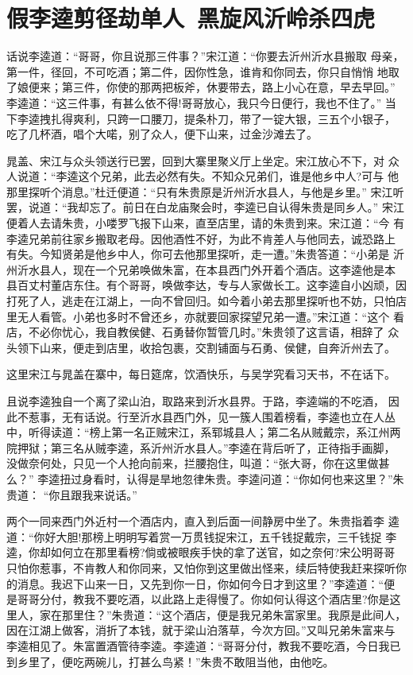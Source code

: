 \chapter{假李逵剪径劫单人~黑旋风沂岭杀四虎}

话说李逵道：“哥哥，你且说那三件事？”宋江道：“你要去沂州沂水县搬取
母亲，第一件，径回，不可吃酒；第二件，因你性急，谁肯和你同去，你只自悄悄
地取了娘便来；第三件，你使的那两把板斧，休要带去，路上小心在意，早去早回。”
李逵道：“这三件事，有甚么依不得!哥哥放心，我只今日便行，我也不住了。”
当下李逵拽扎得爽利，只跨一口腰刀，提条朴刀，带了一锭大银，三五个小银子，
吃了几杯酒，唱个大喏，别了众人，便下山来，过金沙滩去了。

晁盖、宋江与众头领送行已罢，回到大寨里聚义厅上坐定。宋江放心不下，对
众人说道：“李逵这个兄弟，此去必然有失。不知众兄弟们，谁是他乡中人?可与
他那里探听个消息。”杜迁便道：“只有朱贵原是沂州沂水县人，与他是乡里。”
宋江听罢，说道：“我却忘了。前日在白龙庙聚会时，李逵已自认得朱贵是同乡人。”
宋江便着人去请朱贵，小喽罗飞报下山来，直至店里，请的朱贵到来。宋江道：“今
有李逵兄弟前往家乡搬取老母。因他酒性不好，为此不肯差人与他同去，诚恐路上
有失。今知贤弟是他乡中人，你可去他那里探听，走一遭。”朱贵答道：“小弟是
沂州沂水县人，现在一个兄弟唤做朱富，在本县西门外开着个酒店。这李逵他是本
县百丈村董店东住。有个哥哥，唤做李达，专与人家做长工。这李逵自小凶顽，因
打死了人，逃走在江湖上，一向不曾回归。如今着小弟去那里探听也不妨，只怕店
里无人看管。小弟也多时不曾还乡，亦就要回家探望兄弟一遭。”宋江道：“这个
看店，不必你忧心，我自教侯健、石勇替你暂管几时。”朱贵领了这言语，相辞了
众头领下山来，便走到店里，收拾包裹，交割铺面与石勇、侯健，自奔沂州去了。

这里宋江与晁盖在寨中，每日筵席，饮酒快乐，与吴学究看习天书，不在话下。

且说李逵独自一个离了梁山泊，取路来到沂水县界。于路，李逵端的不吃酒，
因此不惹事，无有话说。行至沂水县西门外，见一簇人围着榜看，李逵也立在人丛
中，听得读道：“榜上第一名正贼宋江，系郓城县人；第二名从贼戴宗，系江州两
院押狱；第三名从贼李逵，系沂州沂水县人。”李逵在背后听了，正待指手画脚，
没做奈何处，只见一个人抢向前来，拦腰抱住，叫道：“张大哥，你在这里做甚么？”
李逵扭过身看时，认得是旱地忽律朱贵。李逵问道：“你如何也来这里？”朱贵道：
“你且跟我来说话。”

两个一同来西门外近村一个酒店内，直入到后面一间静房中坐了。朱贵指着李
逵道：“你好大胆!那榜上明明写着赏一万贯钱捉宋江，五千钱捉戴宗，三千钱捉
李逵，你却如何立在那里看榜?倘或被眼疾手快的拿了送官，如之奈何?宋公明哥哥
只怕你惹事，不肯教人和你同来，又怕你到这里做出怪来，续后特使我赶来探听你
的消息。我迟下山来一日，又先到你一日，你如何今日才到这里？”李逵道：“便
是哥哥分付，教我不要吃酒，以此路上走得慢了。你如何认得这个酒店里?你是这
里人，家在那里住？”朱贵道：“这个酒店，便是我兄弟朱富家里。我原是此间人，
因在江湖上做客，消折了本钱，就于梁山泊落草，今次方回。”又叫兄弟朱富来与
李逵相见了。朱富置酒管待李逵。李逵道：“哥哥分付，教我不要吃酒，今日我已
到乡里了，便吃两碗儿，打甚么鸟紧！”朱贵不敢阻当他，由他吃。

